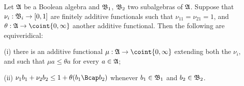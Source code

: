  Let $\frak A$
be a Boolean algebra and $\frak B_1$, $\frak B_2$ two subalgebras of
$\frak A$.   Suppose that $\nu_i:\frak B_i\to[0,1]$ are finitely
additive functionals such that $\nu_11=\nu_21=1$, and
$\theta:\frak A\to\coint{0,\infty}$ another additive functional.
Then the following are equiveridical:

(i) there is an additive functional $\mu:\frak A\to\coint{0,\infty}$
extending both the $\nu_i$, and such that $\mu a\le\theta a$ for every
$a\in\frak A$;

(ii) $\nu_1b_1+\nu_2b_2\le 1+\theta(b_1\Bcap b_2)$ whenever
$b_1\in\frak B_1$ and $b_2\in\frak B_2$.

